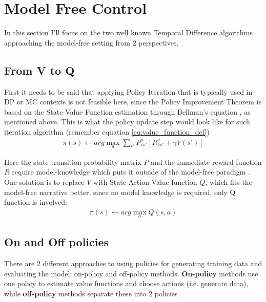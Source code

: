 
\section{Model Free Control }
In this section I'll focus on the two well known 
Temporal Difference algorithms approaching the model-free
setting from 2 perspectives. 


\subsection{From V to Q} 
First it needs to be said that applying Policy Iteration that is typically used in DP or MC contexts is not feasible here, since the Policy Improvement Theorem is based on the State Value Function estimation through Bellman's equation \cite{lecture_mfc}, as mentioned above. This is what the policy update step would look like for such iteration algorithm (remember equation \ref{eq:value_function_def})
\begin{align}
    \pi(s) \leftarrow arg \max_{a} \sum_{s'} P^{a}_{ss'} [R^{a}_{ss'} + \gamma V(s')]
\end{align}

Here the state transition probability matrix $P$ and 
the immediate reward function $R$ require model-knowledge
which puts it outside of the model-free paradigm \cite{lecture_mfc}. One solution is to replace $V$ with 
State-Action Value function $Q$, which fits the 
model-free narrative better, since no model knowledge
is required, only Q function is involved:  
\begin{align}
    \pi(s) \leftarrow arg \max_{a} Q(s, a) 
\end{align}

\subsection{On and Off policies}
There are 2 different approaches to using policies for 
generating training data and evaluating the model: on-policy and
off-policy methods.
\textbf{On-policy} methods use one policy to estimate value functions and choose actions (i.e. generate data), while \textbf{off-policy} methods separate these into 2 policies \cite{lecture_mfc}. 

